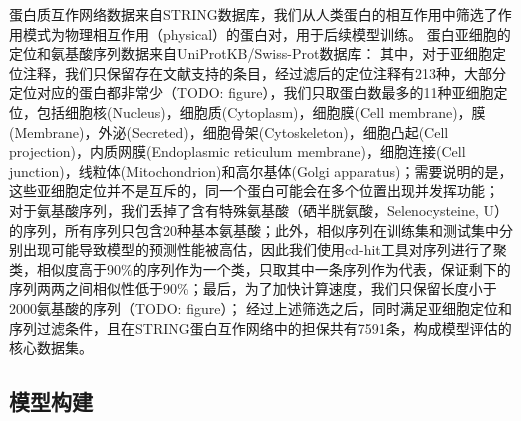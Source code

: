 \documentclass[a4paper,UTF8]{article}
\begin{document}
蛋白质互作网络数据来自STRING数据库，我们从人类蛋白的相互作用中筛选了作用模式为物理相互作用（physical）的蛋白对，用于后续模型训练。
蛋白亚细胞的定位和氨基酸序列数据来自UniProtKB/Swiss-Prot数据库：
其中，对于亚细胞定位注释，我们只保留存在文献支持的条目，经过滤后的定位注释有213种，大部分定位对应的蛋白都非常少（TODO: figure），我们只取蛋白数最多的11种亚细胞定位，包括细胞核(Nucleus)，细胞质(Cytoplasm)，细胞膜(Cell membrane)，膜(Membrane)，外泌(Secreted)，细胞骨架(Cytoskeleton)，细胞凸起(Cell projection)，内质网膜(Endoplasmic reticulum membrane)，细胞连接(Cell junction)，线粒体(Mitochondrion)和高尔基体(Golgi apparatus)；需要说明的是，这些亚细胞定位并不是互斥的，同一个蛋白可能会在多个位置出现并发挥功能；
对于氨基酸序列，我们丢掉了含有特殊氨基酸（硒半胱氨酸，Selenocysteine, U）的序列，所有序列只包含20种基本氨基酸；此外，相似序列在训练集和测试集中分别出现可能导致模型的预测性能被高估，因此我们使用cd-hit工具对序列进行了聚类，相似度高于90\%的序列作为一个类，只取其中一条序列作为代表，保证剩下的序列两两之间相似性低于90\%；最后，为了加快计算速度，我们只保留长度小于2000氨基酸的序列（TODO: figure）；
经过上述筛选之后，同时满足亚细胞定位和序列过滤条件，且在STRING蛋白互作网络中的担保共有7591条，构成模型评估的核心数据集。

\subsection{模型构建}
\end{document}
